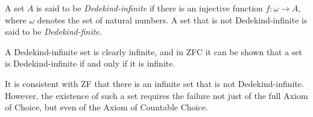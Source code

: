 \documentclass[12pt]{article}
\begin{document}

A set $A$ is said to be \emph{Dedekind-infinite}
if there is an injective function $f\colon\omega\to A$,
where $\omega$ denotes the set of natural numbers.
A set that is not Dedekind-infinite is said to be \emph{Dedekind-finite}.

A Dedekind-infinite set is clearly infinite,
and in ZFC it can be shown that
a set is Dedekind-infinite if and only if it is infinite.

It is consistent with ZF that
there is an infinite set that is not Dedekind-infinite.
However, the existence of such a set requires the failure
not just of the full Axiom of Choice, but even of the Axiom of Countable Choice.
\end{document}
